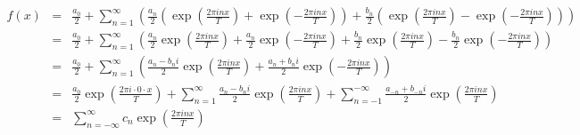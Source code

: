 \documentclass[a4paper]{jsarticle}
\begin{document}
\begin{eqnarray}
	f \left( x \right) &=& \frac { a_0 } { 2 } + \sum _{ n = 1 } ^\infty \left( \frac { a_n } { 2 } \left( \exp \left( \frac { 2 \pi inx } { T } \right) + \exp \left( - \frac { 2 \pi inx } { T } \right) \right) + \frac { b_n } { 2 } \left( \exp \left( \frac { 2 \pi inx } { T } \right) - \exp \left( - \frac { 2 \pi inx } { T } \right) \right) \right) \nonumber \\
	&=& \frac { a_0 } { 2 } + \sum _{ n = 1 } ^\infty \left( \frac { a_n } { 2 } \exp \left( \frac { 2 \pi inx } { T } \right) + \frac { a_n } { 2 } \exp \left( - \frac { 2 \pi inx } { T } \right) + \frac { b_n } { 2 } \exp \left( \frac { 2 \pi inx } { T } \right) - \frac { b_n } { 2 } \exp \left( - \frac { 2 \pi inx } { T } \right) \right) \nonumber \\
	&=& \frac { a_0 } { 2 } + \sum _{ n = 1 } ^\infty \left( \frac { a_n - b_n i } { 2 } \exp \left( \frac { 2 \pi inx } { T } \right) + \frac { a_n + b_n i } { 2 } \exp \left( - \frac { 2 \pi inx } { T } \right) \right) \nonumber \\
	&=& \frac { a_0 } { 2 } \exp \left( \frac { 2 \pi i \cdot 0 \cdot x } { T } \right) + \sum _{ n = 1 } ^\infty \frac { a_n - b_n i } { 2 } \exp \left( \frac { 2 \pi inx } { T } \right) + \sum _{ n = -1 } ^{ - \infty } \frac { a_{-n} + b_{-n} i } { 2 } \exp \left( \frac { 2 \pi inx } { T } \right) \nonumber \\
	&=& \sum _{ n = - \infty } ^\infty c_n \exp \left( \frac { 2 \pi inx } { T } \right)
\end{eqnarray}
\end{document}
